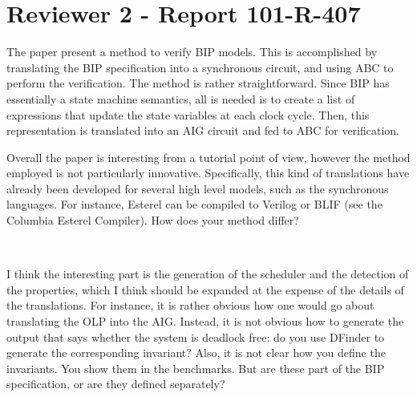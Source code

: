 \section{Reviewer 2 - Report 101-R-407}
%
%
The paper present a method to verify BIP models. This is accomplished by
translating the BIP specification into a synchronous circuit, and using ABC to
perform the verification. The method is rather straightforward. Since BIP has
essentially a state machine semantics, all is needed is to create a list of
expressions that update the state variables at each clock cycle. Then, this
representation is translated into an AIG circuit and fed to ABC for
verification.

Overall the paper is interesting from a tutorial point of view, however the
method employed is not particularly innovative. Specifically, this kind of
translations have already been developed for several high level models, such
as the synchronous languages. For instance, Esterel can be compiled to Verilog
or BLIF (see the Columbia Esterel Compiler). How does your method differ?

~

\done
{}

I think the interesting part is the generation of the scheduler and the
detection of the properties, which I think should be expanded at the expense
of the details of the translations. For instance, it is rather obvious how one
would go about translating the OLP into the AIG. Instead, it is not obvious
how to generate the output that says whether the system is deadlock free: do
you use DFinder to generate the corresponding invariant? Also, it is not clear
how you define the invariants. You show them in the benchmarks. But are these
part of the BIP specification, or are they defined separately?



